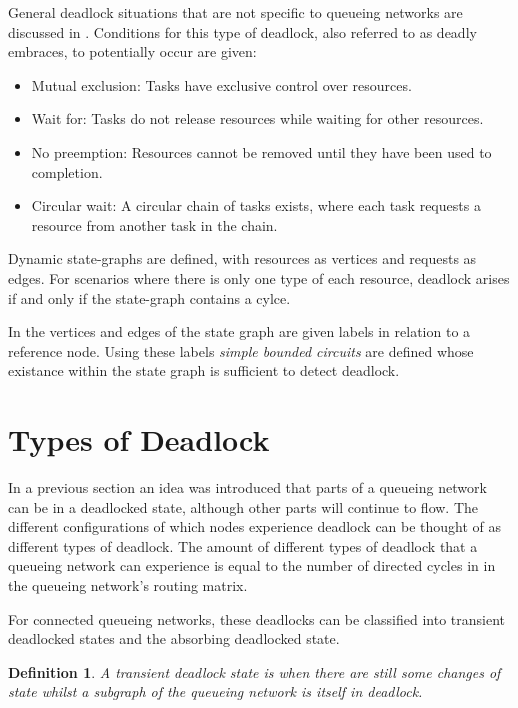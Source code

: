\documentclass{article}
\newtheorem{definition}{Definition}
\begin{document}
General deadlock situations that are not specific to queueing networks are discussed in \cite{coffmanelphick71}.
Conditions for this type of deadlock, also referred to as deadly embraces, to potentially occur are given:
\begin{itemize}
  \item Mutual exclusion: Tasks have exclusive control over resources.
  \item Wait for: Tasks do not release resources while waiting for other resources.
  \item No preemption: Resources cannot be removed until they have been used to completion.
  \item Circular wait: A circular chain of tasks exists, where each task requests a resource from another task in the chain.
\end{itemize}
Dynamic state-graphs are defined, with resources as vertices and requests as edges.
For scenarios where there is only one type of each resource, deadlock arises if and only if the state-graph contains a cylce.

In \cite{choetal95} the vertices and edges of the state graph are given labels in relation to a reference node.
Using these labels \textit{simple bounded circuits} are defined whose existance within the state graph is sufficient to detect deadlock.


\section{Types of Deadlock}\label{sec:typesofdeadlock}
In a previous section an idea was introduced that parts of a queueing network can be in a deadlocked state, although other parts will continue to flow.
The different configurations of which nodes experience deadlock can be thought
of as different types of deadlock.
The amount of different types of deadlock that a queueing network can experience
is equal to the number of directed cycles in in the queueing network's routing
matrix. %

For connected queueing networks, these deadlocks can be classified into transient deadlocked states and the absorbing deadlocked state.\\


\begin{definition}
    A transient deadlock state is when there are still some changes of state
    whilst a subgraph of the queueing network is itself in deadlock.\\
\end{definition}
\end{document}
